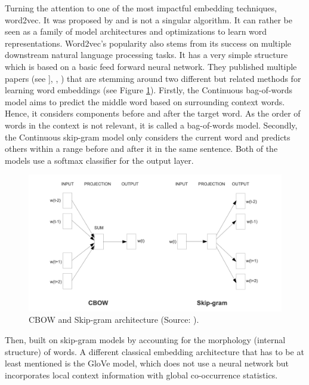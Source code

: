 \documentclass[
]{krantz}
\begin{document}
Turning the attention to one of the most impactful embedding techniques,
word2vec. It was proposed by \citet{Mikolov2013} and is not a singular
algorithm. It can rather be seen as a family of model architectures and
optimizations to learn word representations. Word2vec's popularity also
stems from its success on multiple downstream natural language
processing tasks. It has a very simple structure which is based on a
basic feed forward neural network. They published multiple papers (see
\citet{Mikolov2013}{]}, \citet{Mikolov2013a}, \citet{Mikolov2013b}) that are stemming
around two different but related methods for learning word embeddings
(see Figure \ref{fig:embedArch}). Firstly, the Continuous bag-of-words model aims to predict the
middle word based on surrounding context words. Hence, it considers
components before and after the target word. As the order of words in
the context is not relevant, it is called a bag-of-words model.
Secondly, the Continuous skip-gram model only considers the current word
and predicts others within a range before and after it in the same
sentence. Both of the models use a softmax classifier for the output
layer.

\begin{figure}

{\centering \includegraphics[width=0.85\linewidth]{./figures/01-01-nlp/embed_arch_mikolov_p5} 

}

\caption{CBOW and Skip-gram architecture (Source: \citet{Mikolov2013}).}\label{fig:embedArch}
\end{figure}



Then, \citet{Bojanowski2016} built on skip-gram models by accounting for the
morphology (internal structure) of words. A different classical
embedding architecture that has to be at least mentioned is the GloVe
model, which does not use a neural network but incorporates local
context information with global co-occurrence statistics.
\end{document}
